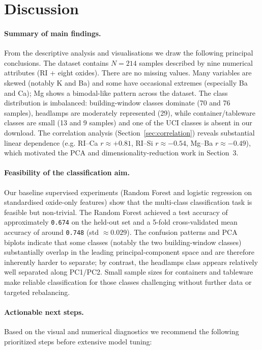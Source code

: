 \documentclass[dtu]{dtuarticle}
\begin{document}
	\section{Discussion}
	\paragraph{Summary of main findings.}
	From the descriptive analysis and visualisations we draw the following principal conclusions. The dataset
	contains $N=214$ samples described by nine numerical attributes (RI + eight oxides). There are no
	missing values. Many variables are skewed (notably K and Ba) and some have occasional extremes
	(especially Ba and Ca); Mg shows a bimodal-like pattern across the dataset. The class distribution is
	imbalanced: building-window classes dominate (70 and 76 samples), headlamps are moderately represented
	(29), while container/tableware classes are small (13 and 9 samples) and one of the UCI classes is
	absent in our download. The correlation analysis (Section~\ref{sec:correlation}) reveals substantial
	linear dependence (e.g. RI--Ca $r\approx +0.81$, RI--Si $r\approx -0.54$, Mg--Ba $r\approx -0.49$),
	which motivated the PCA and dimensionality-reduction work in Section~3.
	
	\paragraph{Feasibility of the classification aim.}
	Our baseline supervised experiments (Random Forest and logistic regression on standardised oxide-only
	features) show that the multi-class classification task is feasible but non-trivial. The Random Forest
	achieved a test accuracy of approximately \texttt{0.674} on the held-out set and a 5-fold cross-validated
	mean accuracy of around \texttt{0.748} (std $\approx 0.029$). The confusion patterns and PCA biplots
	indicate that some classes (notably the two building-window classes) substantially overlap in the
	leading principal-component space and are therefore inherently harder to separate; by contrast, the
	headlamps class appears relatively well separated along PC1/PC2. Small sample sizes for containers and
	tableware make reliable classification for those classes challenging without further data or targeted
	rebalancing.
	
	\paragraph{Actionable next steps.}
	Based on the visual and numerical diagnostics we recommend the following prioritized steps before
	extensive model tuning:
	
\end{document}
